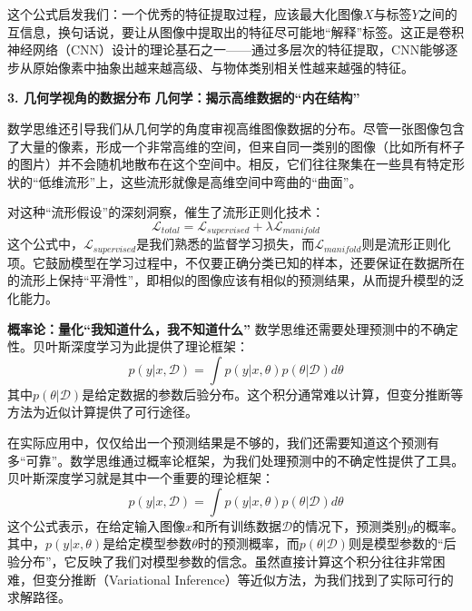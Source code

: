 这个公式启发我们：一个优秀的特征提取过程，应该最大化图像$X$与标签$Y$之间的互信息，换句话说，要让从图像中提取出的特征尽可能地“解释”标签。这正是卷积神经网络（CNN）设计的理论基石之一——通过多层次的特征提取，CNN能够逐步从原始像素中抽象出越来越高级、与物体类别相关性越来越强的特征。

\textbf{3. 几何学视角的数据分布}
\textbf{几何学：揭示高维数据的“内在结构”}

数学思维还引导我们从几何学的角度审视高维图像数据的分布。尽管一张图像包含了大量的像素，形成一个非常高维的空间，但来自同一类别的图像（比如所有杯子的图片）并不会随机地散布在这个空间中。相反，它们往往聚集在一些具有特定形状的“低维流形”上，这些流形就像是高维空间中弯曲的“曲面”。

对这种“流形假设”的深刻洞察，催生了流形正则化技术：
$$\mathcal{L}_{total} = \mathcal{L}_{supervised} + \lambda \mathcal{L}_{manifold}$$
这个公式中，$\mathcal{L}_{supervised}$是我们熟悉的监督学习损失，而$\mathcal{L}_{manifold}$则是流形正则化项。它鼓励模型在学习过程中，不仅要正确分类已知的样本，还要保证在数据所在的流形上保持“平滑性”，即相似的图像应该有相似的预测结果，从而提升模型的泛化能力。

\textbf{概率论：量化“我知道什么，我不知道什么”}
数学思维还需要处理预测中的不确定性。贝叶斯深度学习为此提供了理论框架：
$$p(y|x, \mathcal{D}) = \int p(y|x, \theta) p(\theta|\mathcal{D}) d\theta$$
其中$p(\theta|\mathcal{D})$是给定数据的参数后验分布。这个积分通常难以计算，但变分推断等方法为近似计算提供了可行途径。

在实际应用中，仅仅给出一个预测结果是不够的，我们还需要知道这个预测有多“可靠”。数学思维通过概率论框架，为我们处理预测中的不确定性提供了工具。贝叶斯深度学习就是其中一个重要的理论框架：
$$p(y|x, \mathcal{D}) = \int p(y|x, \theta) p(\theta|\mathcal{D}) d\theta$$
这个公式表示，在给定输入图像$x$和所有训练数据$\mathcal{D}$的情况下，预测类别$y$的概率。其中，$p(y|x, \theta)$是给定模型参数$\theta$时的预测概率，而$p(\theta|\mathcal{D})$则是模型参数的“后验分布”，它反映了我们对模型参数的信念。虽然直接计算这个积分往往非常困难，但变分推断（Variational Inference）等近似方法，为我们找到了实际可行的求解路径。

